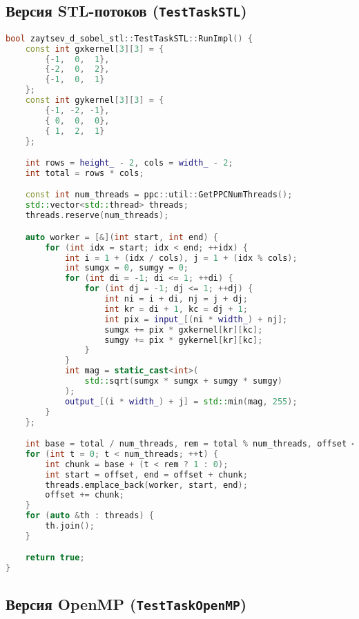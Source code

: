 \documentclass[12pt]{article}
\begin{document}
\subsection{Версия STL-потоков (\texttt{TestTaskSTL})}

\begin{lstlisting}[language=C++, caption={Параллельная реализация с использованием std::thread}]
bool zaytsev_d_sobel_stl::TestTaskSTL::RunImpl() {
    const int gxkernel[3][3] = {
        {-1,  0,  1},
        {-2,  0,  2},
        {-1,  0,  1}
    };
    const int gykernel[3][3] = {
        {-1, -2, -1},
        { 0,  0,  0},
        { 1,  2,  1}
    };

    int rows = height_ - 2, cols = width_ - 2;
    int total = rows * cols;

    const int num_threads = ppc::util::GetPPCNumThreads();
    std::vector<std::thread> threads;
    threads.reserve(num_threads);

    auto worker = [&](int start, int end) {
        for (int idx = start; idx < end; ++idx) {
            int i = 1 + (idx / cols), j = 1 + (idx % cols);
            int sumgx = 0, sumgy = 0;
            for (int di = -1; di <= 1; ++di) {
                for (int dj = -1; dj <= 1; ++dj) {
                    int ni = i + di, nj = j + dj;
                    int kr = di + 1, kc = dj + 1;
                    int pix = input_[(ni * width_) + nj];
                    sumgx += pix * gxkernel[kr][kc];
                    sumgy += pix * gykernel[kr][kc];
                }
            }
            int mag = static_cast<int>(
                std::sqrt(sumgx * sumgx + sumgy * sumgy)
            );
            output_[(i * width_) + j] = std::min(mag, 255);
        }
    };

    int base = total / num_threads, rem = total % num_threads, offset = 0;
    for (int t = 0; t < num_threads; ++t) {
        int chunk = base + (t < rem ? 1 : 0);
        int start = offset, end = offset + chunk;
        threads.emplace_back(worker, start, end);
        offset += chunk;
    }
    for (auto &th : threads) {
        th.join();
    }

    return true;
}
\end{lstlisting}

\subsection{Версия OpenMP (\texttt{TestTaskOpenMP})}
\end{document}
